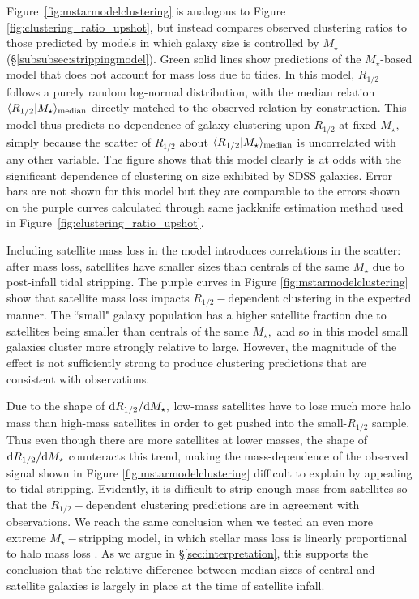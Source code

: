 \documentclass[usenatbib,usegraphicx,letterpaper]{mn2e}
\newcommand{\rhalf}{R_{1/2}}
\newcommand{\mstar}{M_{\star}}
\newcommand{\median}[2]{\langle{#1}\vert{#2}\rangle_{\rm median}}
\begin{document}
Figure~\ref{fig:mstarmodelclustering} is analogous to Figure \ref{fig:clustering_ratio_upshot}, but instead compares observed clustering ratios to those predicted by models
in which galaxy size is controlled by $\mstar$ (\S\ref{subsubsec:strippingmodel}). Green solid lines show predictions of the $\mstar$-based model that does not account for mass loss due to tides. In this model, $\rhalf$ follows a purely random log-normal distribution, with the median relation $\median{\rhalf}{\mstar}$ directly matched to the observed relation by construction.  This model thus predicts no dependence of galaxy clustering upon $\rhalf$ at fixed $\mstar,$ simply because the scatter of $\rhalf$ about $\median{\rhalf}{\mstar}$ is uncorrelated with any other variable. The figure shows that this model clearly is at odds with the significant dependence of clustering on size exhibited by SDSS galaxies. Error bars are not shown for this model but they are comparable to the errors shown on the purple curves calculated through same jackknife estimation method used in Figure~\ref{fig:clustering_ratio_upshot}.

Including satellite mass loss in the model introduces correlations in the scatter: after mass loss, satellites have smaller sizes than centrals of the same $\mstar$ due to post-infall tidal stripping.
The purple curves in Figure \ref{fig:mstarmodelclustering} show that satellite mass loss impacts $\rhalf-$dependent clustering in the expected manner. The ``small" galaxy population has a higher satellite fraction due to satellites being smaller than centrals of the same $\mstar,$ and so in this model small galaxies cluster more strongly relative to large. However, the magnitude of the effect is not sufficiently strong to produce clustering predictions that are consistent with observations.

Due to the shape of ${\rm d}\rhalf/{\rm d}\mstar,$ low-mass satellites have to lose much more halo mass than high-mass satellites in order to get pushed into the small-$\rhalf$ sample. Thus even though there are more satellites at lower masses, the shape of ${\rm d}\rhalf/{\rm d}\mstar$ counteracts this trend, making the mass-dependence of the observed signal shown in Figure \ref{fig:mstarmodelclustering} difficult to explain by appealing to tidal stripping. Evidently, it is difficult to strip enough mass from satellites so that the $\rhalf-$dependent clustering predictions are in agreement with observations.  We reach the same conclusion when we tested an even more extreme $\mstar-$stripping model, in which stellar mass loss is linearly proportional to halo mass loss \citep[][Model 1]{watson_etal12}.
As we argue in \S\ref{sec:interpretation}, this supports the conclusion that the relative difference between median sizes of central and satellite galaxies is largely in place at the time of satellite infall.
\end{document}
